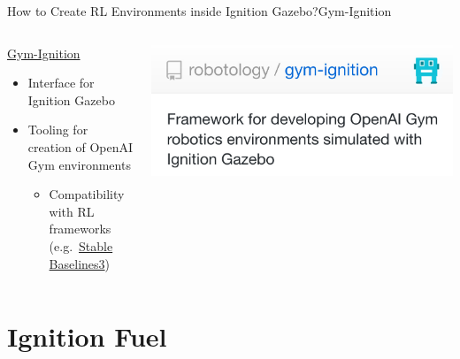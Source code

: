 \begin{frame}{How to Create RL Environments inside Ignition Gazebo?}{Gym-Ignition}
    \begin{columns}%
        \begin{column}{0.5\textwidth}%
            \begin{block}{\href{https://github.com/robotology/gym-ignition}{Gym-Ignition}}
                \begin{itemize}
                    \item Interface for Ignition Gazebo
                    \item Tooling for creation of OpenAI Gym environments%
                          \begin{itemize}
                              \item Compatibility with RL frameworks (e.g.~\href{https://github.com/DLR-RM/stable-baselines3}{Stable Baselines3})
                          \end{itemize}
                \end{itemize}
            \end{block}
        \end{column}
        \begin{column}{0.5\textwidth}%
            \centering
            \href{https://github.com/robotology/gym-ignition}{\includegraphics[width=1.0\textwidth]{graphics/gym_ignition.png}}
        \end{column}
    \end{columns}
\end{frame}


\section{Ignition Fuel}

